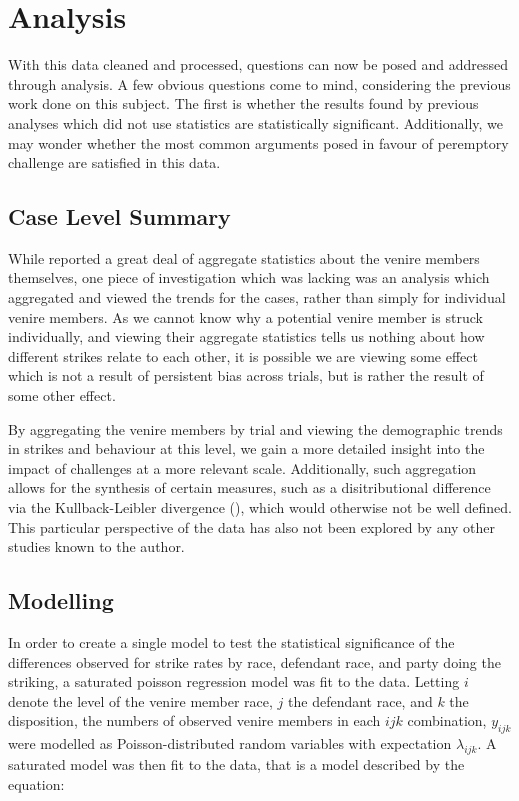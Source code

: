 \chapter{Analysis} \label{c:analysis}

With this data cleaned and processed, questions can now be posed and addressed through analysis. A few obvious questions come to
mind, considering the previous work done on this subject. The first is whether the results found by previous analyses which did
not use statistics are statistically significant. Additionally, we may wonder whether the most common arguments posed in favour of
peremptory challenge are satisfied in this data.

\section{Case Level Summary} \label{sec:casesum}

While \cite{JurySunshineProj} reported a great deal of aggregate statistics about the venire members themselves, one piece of
investigation which was lacking was an analysis which aggregated and viewed the trends for the cases, rather than simply for
individual venire members. As we cannot know why a potential venire member is struck individually, and viewing their aggregate
statistics tells us nothing about how different strikes relate to each other, it is possible we are viewing some effect which is
not a result of persistent bias across trials, but is rather the result of some other effect.

By aggregating the venire members by trial and viewing the demographic trends in strikes and behaviour at this level, we gain a
more detailed insight into the impact of challenges at a more relevant scale. Additionally, such aggregation allows for the
synthesis of certain measures, such as a disitributional difference via the Kullback-Leibler divergence (\cite{kullback1951}),
which would otherwise not be well defined. This particular perspective of the data has also not been explored by any other studies
known to the author.

\section{Modelling} \label{sec:mods}

In order to create a single model to test the statistical significance of the differences observed for strike rates by race,
defendant race, and party doing the striking, a saturated poisson regression model was fit to the data. Letting $i$ denote the
level of the venire member race, $j$ the defendant race, and $k$ the disposition, the numbers of observed venire members in each
$ijk$ combination, $y_{ijk}$ were modelled as Poisson-distributed random variables with expectation $\lambda_{ijk}$. A saturated
model was then fit to the data, that is a model described by the equation:

